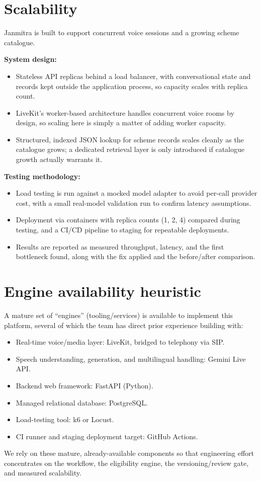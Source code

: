\documentclass[11pt,a4paper]{article}
\begin{document}
\section{Scalability}
Janmitra is built to support concurrent voice sessions and a growing scheme catalogue.

\textbf{System design:}
\begin{itemize}[leftmargin=0.7cm]
    \item Stateless API replicas behind a load balancer, with conversational state and records kept outside the application process, so capacity scales with replica count.
    \item LiveKit's worker-based architecture handles concurrent voice rooms by design, so scaling here is simply a matter of adding worker capacity.
    \item Structured, indexed JSON lookup for scheme records scales cleanly as the catalogue grows; a dedicated retrieval layer is only introduced if catalogue growth actually warrants it.
\end{itemize}

\textbf{Testing methodology:}
\begin{itemize}[leftmargin=0.7cm]
    \item Load testing is run against a mocked model adapter to avoid per-call provider cost, with a small real-model validation run to confirm latency assumptions.
    \item Deployment via containers with replica counts (1, 2, 4) compared during testing, and a CI/CD pipeline to staging for repeatable deployments.
    \item Results are reported as measured throughput, latency, and the first bottleneck found, along with the fix applied and the before/after comparison.
\end{itemize}

\section{Engine availability heuristic}
A mature set of ``engines'' (tooling/services) is available to implement this platform, several of which the team has direct prior experience building with:
\begin{itemize}[leftmargin=0.7cm]
    \item Real-time voice/media layer: LiveKit, bridged to telephony via SIP.
    \item Speech understanding, generation, and multilingual handling: Gemini Live API.
    \item Backend web framework: FastAPI (Python).
    \item Managed relational database: PostgreSQL.
    \item Load-testing tool: k6 or Locust.
    \item CI runner and staging deployment target: GitHub Actions.
\end{itemize}
We rely on these mature, already-available components so that engineering effort concentrates on the workflow, the eligibility engine, the versioning/review gate, and measured scalability.
\end{document}
